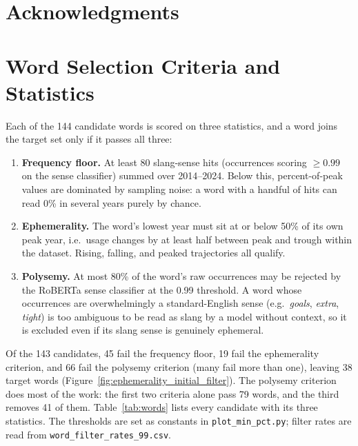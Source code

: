 \documentclass[11pt]{article}
\begin{document}
\section*{Acknowledgments}



\appendix

\section{Word Selection Criteria and Statistics}%
\label{app:ephemerality}

Each of the 144 candidate words is scored on three statistics, and a word joins
the target set only if it passes all three:

\begin{enumerate}
\itemsep2pt
\item \textbf{Frequency floor.} At least 80 slang-sense hits (occurrences scoring
  $\geq 0.99$ on the sense classifier) summed over 2014--2024. Below this,
  percent-of-peak values are dominated by sampling noise: a word with a handful of
  hits can read 0\% in several years purely by chance.
\item \textbf{Ephemerality.} The word's lowest year must sit at or below 50\% of
  its own peak year, i.e.\ usage changes by at least half between peak and trough
  within the dataset. Rising, falling, and peaked trajectories all qualify.
\item \textbf{Polysemy.} At most 80\% of the word's raw occurrences may be rejected
  by the RoBERTa sense classifier at the 0.99 threshold. A word whose occurrences
  are overwhelmingly a standard-English sense (e.g.\ \textit{goals}, \textit{extra},
  \textit{tight}) is too ambiguous to be read as slang by a model without context,
  so it is excluded even if its slang sense is genuinely ephemeral.
\end{enumerate}

Of the 143 candidates, 45 fail the frequency floor, 19 fail the ephemerality
criterion, and 66 fail the polysemy criterion (many fail more than one), leaving
38 target words (Figure~\ref{fig:ephemerality_initial_filter}). The polysemy
criterion does most of the work: the first two criteria alone pass 79 words, and
the third removes 41 of them. Table~\ref{tab:words} lists every candidate with
its three statistics. The thresholds are set as constants in
\texttt{plot\_min\_pct.py}; filter rates are read from
\texttt{word\_filter\_rates\_99.csv}.
\end{document}
